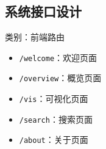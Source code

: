 \documentclass[a4paper,AutoFakeBold,oneside,12pt]{book}
\begin{document}
\subsection{系统接口设计}

类别：前端路由
\begin{itemize}
	\item \lstinline|/welcome|：欢迎页面
	\item \lstinline|/overview|：概览页面
	\item \lstinline|/vis|：可视化页面
	\item \lstinline|/search|：搜索页面
	\item \lstinline|/about|：关于页面
\end{itemize}
\end{document}
